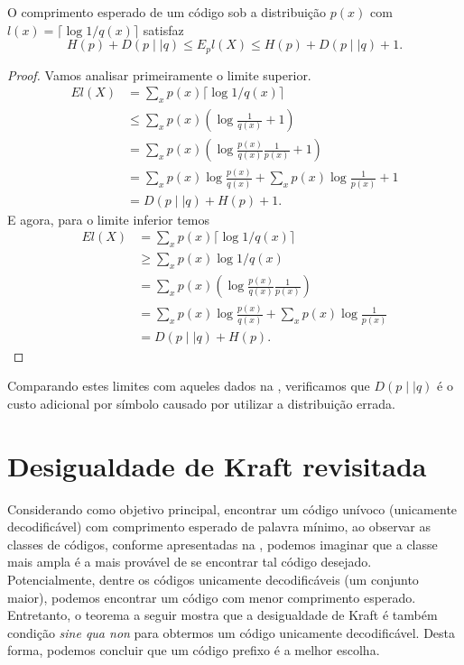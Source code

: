 \begin{theorem}
O comprimento esperado de um código sob a distribuição $p(x)$ com $l(x) = \lceil \log 1/q(x) \rceil$ satisfaz
\begin{equation}
  H(p) + D(p \mid \mid q) \leq E_p l(X) \leq H(p) + D(p \mid \mid q) + 1 .
\end{equation}
\end{theorem}
\begin{proof}
Vamos analisar primeiramente o limite superior.  
\begin{subequations}
  \begin{align}
    E l(X) &= \sum_x p(x) \lceil \log 1/q(x) \rceil \\
           &\leq \sum_x p(x) \left( \log \frac{1}{q(x)} + 1 \right) \\
           &= \sum_x p(x) \left( \log \frac{p(x)}{q(x)} \frac{1}{p(x)} + 1 \right) \\
           &= \sum_x p(x) \log \frac{p(x)}{q(x)} + \sum_x p(x) \log \frac{1}{p(x)} + 1 \\
           &= D(p \mid \mid q) + H(p) + 1 .
  \end{align}
\end{subequations}
E agora, para o limite inferior temos
\begin{subequations}
  \begin{align}
    E l(X) &= \sum_x p(x) \lceil \log 1/q(x) \rceil \\
           &\geq \sum_x p(x) \log 1/q(x) \\
           &= \sum_x p(x) \left( \log \frac{p(x)}{q(x)} \frac{1}{p(x)}\right) \\
           &= \sum_x p(x) \log \frac{p(x)}{q(x)} + \sum_x p(x) \log \frac{1}{p(x)} \\
           &= D(p \mid \mid q) + H(p) .
  \end{align}
\end{subequations}
\end{proof}
Comparando estes limites com aqueles dados na , verificamos que
$D(p \mid \mid q)$ é o custo adicional por símbolo causado por utilizar a distribuição errada.





\section{Desigualdade de Kraft revisitada}
Considerando como objetivo principal, encontrar um código unívoco (unicamente decodificável)
com comprimento esperado de palavra mínimo, ao observar as classes de códigos, conforme
apresentadas na , podemos imaginar que a classe mais ampla é a mais
provável de se encontrar tal código desejado. Potencialmente, dentre os códigos
unicamente decodificáveis (um conjunto maior), podemos encontrar um código com menor comprimento esperado.
Entretanto, o teorema a seguir mostra que a desigualdade de Kraft é também
condição \emph{sine qua non} para obtermos um código unicamente
decodificável. Desta forma, podemos concluir que um código prefixo é a melhor escolha.

